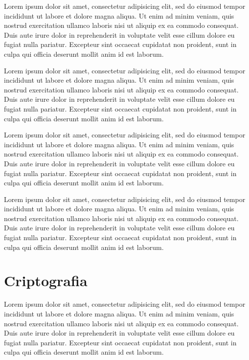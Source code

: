 \documentclass{tcc}
\begin{document}


	Lorem ipsum dolor sit amet, consectetur adipisicing elit, sed do eiusmod
	tempor incididunt ut labore et dolore magna aliqua. Ut enim ad minim veniam,
	quis nostrud exercitation ullamco laboris nisi ut aliquip ex ea commodo
	consequat. Duis aute irure dolor in reprehenderit in voluptate velit esse
	cillum dolore eu fugiat nulla pariatur. Excepteur sint occaecat cupidatat non
	proident, sunt in culpa qui officia deserunt mollit anim id est laborum.

	Lorem ipsum dolor sit amet, consectetur adipisicing elit, sed do eiusmod
	tempor incididunt ut labore et dolore magna aliqua. Ut enim ad minim veniam,
	quis nostrud exercitation ullamco laboris nisi ut aliquip ex ea commodo
	consequat. Duis aute irure dolor in reprehenderit in voluptate velit esse
	cillum dolore eu fugiat nulla pariatur. Excepteur sint occaecat cupidatat non
	proident, sunt in culpa qui officia deserunt mollit anim id est laborum.

	Lorem ipsum dolor sit amet, consectetur adipisicing elit, sed do eiusmod
	tempor incididunt ut labore et dolore magna aliqua. Ut enim ad minim veniam,
	quis nostrud exercitation ullamco laboris nisi ut aliquip ex ea commodo
	consequat. Duis aute irure dolor in reprehenderit in voluptate velit esse
	cillum dolore eu fugiat nulla pariatur. Excepteur sint occaecat cupidatat non
	proident, sunt in culpa qui officia deserunt mollit anim id est laborum.

	Lorem ipsum dolor sit amet, consectetur adipisicing elit, sed do eiusmod
	tempor incididunt ut labore et dolore magna aliqua. Ut enim ad minim veniam,
	quis nostrud exercitation ullamco laboris nisi ut aliquip ex ea commodo
	consequat. Duis aute irure dolor in reprehenderit in voluptate velit esse
	cillum dolore eu fugiat nulla pariatur. Excepteur sint occaecat cupidatat non
	proident, sunt in culpa qui officia deserunt mollit anim id est laborum.

	\section{Criptografia}

	Lorem ipsum dolor sit amet, consectetur adipisicing elit, sed do eiusmod
	tempor incididunt ut labore et dolore magna aliqua. Ut enim ad minim veniam,
	quis nostrud exercitation ullamco laboris nisi ut aliquip ex ea commodo
	consequat. Duis aute irure dolor in reprehenderit in voluptate velit esse
	cillum dolore eu fugiat nulla pariatur. Excepteur sint occaecat cupidatat non
	proident, sunt in culpa qui officia deserunt mollit anim id est laborum.
\end{document}
